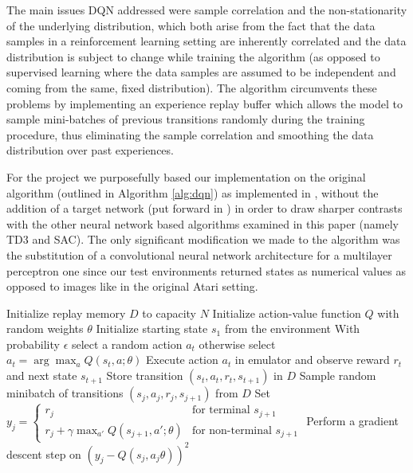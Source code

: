 \documentclass{article}
\begin{document}
The main issues DQN addressed were sample correlation and the non-stationarity of the underlying distribution, which both arise from the fact that the data samples in a reinforcement learning setting are inherently correlated and the data distribution is subject to change while training the algorithm (as opposed to supervised learning where the data samples are assumed to be independent and coming from the same, fixed distribution). The algorithm circumvents these problems by implementing an experience replay buffer \citep{lin1992reinforcement} which allows the model to sample mini-batches of previous transitions randomly during the training procedure, thus eliminating the sample correlation and smoothing the data distribution over past experiences.

For the project we purposefully based our implementation on the original algorithm (outlined in Algorithm \ref{alg:dqn}) as implemented in \citep{mnih2013playing}, without the addition of a target network (put forward in \citep{mnih2015human}) in order to draw sharper contrasts with the other neural network based algorithms examined in this paper (namely TD3 and SAC). The only significant modification we made to the algorithm was the substitution of a convolutional neural network architecture for a multilayer perceptron one since our test environments returned states as numerical values as opposed to images like in the original Atari setting.

\begin{algorithm}
\caption{Deep Q-learning with Experience Replay (based on \citep{mnih2013playing})}
\label{alg:dqn}
\begin{algorithmic}
\State Initialize replay memory $D$ to capacity $N$
\State Initialize action-value function $Q$ with random weights $\theta$
    \State Initialize starting state $s_1$ from the environment
        \State With probability $\epsilon$ select a random action $a_t$
        \State otherwise select $a_t = \arg\max_a Q(s_t, a; \theta)$
        \State Execute action $a_t$ in emulator and observe reward $r_t$ and next state $s_{t+1}$
        \State Store transition $(s_t, a_t, r_t, s_{t+1})$ in $D$
        \State Sample random minibatch of transitions $(s_j, a_j, r_j, s_{j+1})$ from $D$
        \State Set $y_j = 
        \begin{cases} 
        r_j & \text{for terminal } s_{j+1}\\
        r_j + \gamma \max_{a'} Q(s_{j+1}, a'; \theta) & \text{for non-terminal } s_{j+1}
        \end{cases}$
        \State Perform a gradient descent step on $(y_j - Q(s_j, a_j\theta))^2$
    \EndFor
\EndFor
\end{algorithmic}
\end{algorithm}
\end{document}
